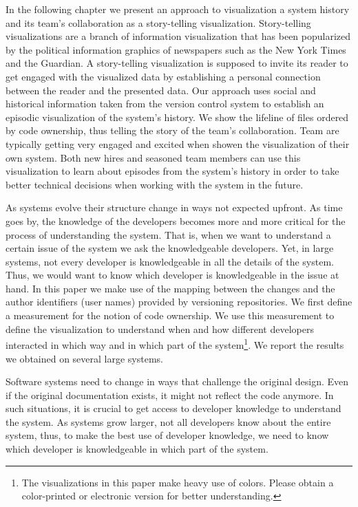 In the following chapter we present an approach to visualization a system history and its team's collaboration as a story-telling visualization. Story-telling visualizations are a branch of information visualization that has been popularized by the political information graphics of newspapers such as the New York Times and the Guardian. A story-telling visualization is supposed to invite its reader to get engaged with the visualized data by establishing a personal connection between the reader and the presented data. Our approach uses social and historical information taken from the version control system to establish an episodic visualization of the system's history. We show the lifeline of files ordered by code ownership, thus telling the story of the team's collaboration. Team are typically getting very engaged and excited when showen the visualization of their own system. Both new hires and seasoned team members can use this visualization to learn about episodes from the system's history in order to take better technical decisions when working with the system in the future.

\asteriskasteriskasterisk

As systems evolve their structure change in ways not expected upfront. As time goes by, the knowledge of the developers becomes more and more critical for the process of understanding the system. That is, when we want to understand a certain issue of the system we ask the knowledgeable developers. Yet, in large systems, not every developer is knowledgeable in all the details of the system. Thus, we would want to know which developer is knowledgeable in the issue at hand. In this paper we make use of the mapping between the changes and the author identifiers (\eg user names) provided by versioning repositories. We first define a measurement for the notion of code ownership. We use this measurement to define the \omap visualization to understand when and how different developers interacted in which way and in which part of the system\footnote{The visualizations in this paper make heavy use of colors. Please obtain a color-printed or electronic version for better understanding.}. We report the results we obtained on several large systems.

Software systems need to change in ways that challenge the original design. Even if the original documentation exists, it might not reflect the code anymore. In such situations, it is crucial to get access to developer knowledge to understand the system. As systems grow larger, not all developers know about the entire system, thus, to make the best use of developer knowledge, we need to know which developer is knowledgeable in which part of the system.

